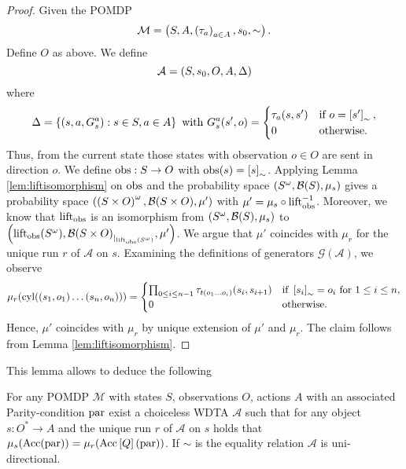 \begin{proof}
  Given the \ac{POMDP}
  \begin{equation*}
    \mathcal{M} = \left(S, A, \left(\tau_{a}\right)_{a\in A}, s_{0}, \sim\right).
  \end{equation*}
  Define $O$ as above. We define
  \begin{equation*}
    \mathcal{A} = \left(S, s_{0}, O, A, \Delta\right)
  \end{equation*}
  where
  \begin{equation*}
    \Delta = \left\{\left(s, a, G_{s}^{a}\right):s\in S,a\in A\right\}\text{ with }
    G_{s}^{a}(s', o) = \begin{cases}
      \tau_{a}(s, s')&\text{if }o = \left[s'\right]_{\sim},\\
      0              &\text{otherwise.}
    \end{cases}
  \end{equation*}
  Thus, from the current state those states with observation $o\in O$ are sent
  in direction $o$. We define $\operatorname{obs}:S\rightarrow O$ with
  $\operatorname{obs}(s) = \left[s\right]_{\sim}$. Applying Lemma \ref{lem:liftisomorphism}
  on $\operatorname{obs}$ and the probability space $\left(S^{\omega}, \mathcal{B}(S),
  \mu_{s}\right)$ gives a probability space $\left(\left(S\times O\right)^{\omega},
  \mathcal{B}(S\times O), \mu'\right)$ with $\mu' = \mu_{s}\circ\operatorname{lift}_{\operatorname{obs}}^{-1}$.
  Moreover, we know that $\operatorname{lift}_{\operatorname{obs}}$ is an isomorphism from
  $\left(S^{\omega}, \mathcal{B}(S), \mu_{s}\right)$ to
  $\left(\operatorname{lift}_{\operatorname{obs}}(S^{\omega}),
    {\mathcal{B}(S\times O)}_{|_{\operatorname{lift}_{\operatorname{obs}}(S^{\omega})}}, \mu'\right)$.
  We argue that $\mu'$ coincides with $\mu_{r}$ for the unique run $r$ of
  $\mathcal{A}$ on $s$. Examining the definitions of generators
  $\mathcal{G}(\mathcal{A})$, we observe
  \begin{equation}
    \mu_{r}(\operatorname{cyl}(\left(s_{1},o_{1}\right)\dots\left(s_{n},o_{n}\right))) =
    \begin{cases}
      \prod_{0\leq i\leq n-1}\tau_{t(o_{1}\dots o_{i})}(s_{i}, s_{i+1})
        &\text{if }\left[s_{i}\right]_{\sim} = o_{i}\text{ for }1\leq i\leq n,\\
      0 &\text{otherwise}.
    \end{cases}
    \label{eq:wdtapomdp}
  \end{equation}
  Hence, $\mu'$ coincides with $\mu_{r}$ by unique extension of $\mu'$ and
  $\mu_{r}$. The claim follows from Lemma \ref{lem:liftisomorphism}.
\end{proof}
This lemma allows to deduce the following
\begin{theorem}
  For any \ac{POMDP} $\mathcal{M}$ with states $S$, observations $O$, actions
  $A$ with an associated Parity-condition $\operatorname{par}$ exist a choiceless
  \ac{WDTA} $\mathcal{A}$ such that for any object $s:O^{*}\rightarrow A$ and
  the unique run $r$ of $\mathcal{A}$ on $s$ holds that
  $\mu_{s}(\operatorname{Acc}(\operatorname{par})) = \mu_{r}(\operatorname{Acc}\left[Q\right](\operatorname{par}))$. If $\sim$ is
  the equality relation $\mathcal{A}$ is uni-directional.
  \label{thm:POMDPequivWDTA}
\end{theorem}

